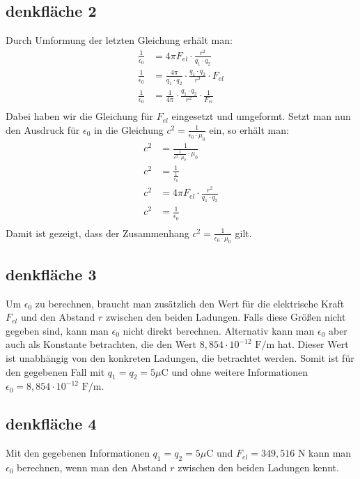 \documentclass[a4paper]{report}
\begin{document}
\subsection{denkfläche 2}
Durch Umformung der letzten Gleichung erhält man:
\begin{align}
\frac{1}{\epsilon_0} &= 4\pi F_{el} \cdot \frac{r^2}{q_1 \cdot q_2} \\
\frac{1}{\epsilon_0} &= \frac{4\pi}{q_1 \cdot q_2} \cdot \frac{q_1 \cdot q_2}{r^2} \cdot F_{el} \\
\frac{1}{\epsilon_0} &= \frac{1}{4\pi} \cdot \frac{q_1 \cdot q_2}{r^2} \cdot \frac{1}{F_{el}} \\
\end{align}
Dabei haben wir die Gleichung für $F_{el}$ eingesetzt und umgeformt.
Setzt man nun den Ausdruck für $\epsilon_0$ in die Gleichung $c^2 = \frac{1}{\epsilon_0 \cdot \mu_0}$ ein, so erhält man:
\begin{align}
c^2 &= \frac{1}{\frac{1}{c^2\cdot \mu_0} \cdot \mu_0} \\
c^2 &= \frac{1}{\frac{1}{\epsilon_0}} \\
c^2 &= 4\pi F_{el} \cdot \frac{r^2}{q_1 \cdot q_2} \\
c^2 &= \frac{1}{\epsilon_0} \\
\end{align}
Damit ist gezeigt, dass der Zusammenhang $c^2 = \frac{1}{\epsilon_0 \cdot \mu_0}$ gilt.
\subsection{denkfläche 3}
Um $\epsilon_0$ zu berechnen, braucht man zusätzlich den Wert für die
elektrische Kraft $F_{el}$ und den Abstand $r$ zwischen den beiden Ladungen.
Falls diese Größen nicht gegeben sind, kann man $\epsilon_0$ nicht direkt
berechnen.
Alternativ kann man $\epsilon_0$ aber auch als Konstante betrachten, die den
Wert $8,854 \cdot 10^{-12} \text{ F/m}$ hat. Dieser Wert ist unabhängig von den
konkreten Ladungen, die betrachtet werden.
Somit ist für den gegebenen Fall mit $q_1=q_2=5\mu\text{C}$ und ohne weitere
Informationen $\epsilon_0=8,854 \cdot 10^{-12} \text{ F/m}$.
\subsection{denkfläche 4}
Mit den gegebenen Informationen $q_1=q_2=5\mu\text{C}$ und
$F_{el}=349,516\text{ N}$ kann man $\epsilon_0$ berechnen, wenn man den Abstand
$r$ zwischen den beiden Ladungen kennt.
\end{document}
